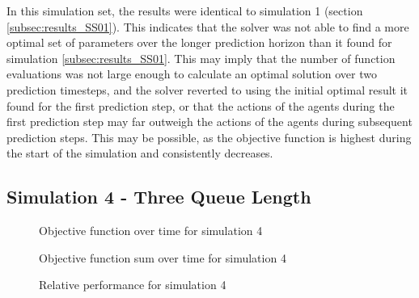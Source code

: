 \documentclass[conference]{IEEEtran}
\begin{document}
In this simulation set, the results were identical to simulation 1 (section \ref{subsec:results_SS01}).
This indicates that the solver was not able to find a more optimal set of parameters over the longer prediction horizon than it found for simulation \ref{subsec:results_SS01}.
This may imply that the number of function evaluations was not large enough to calculate an optimal solution over two prediction timesteps, and the solver reverted to using the initial optimal result it found for the first prediction step, or that the actions of the agents during the first prediction step may far outweigh the actions of the agents during subsequent prediction steps.
This may be possible, as the objective function is highest during the start of the simulation and consistently decreases.


\subsection{Simulation 4 - Three Queue Length} \label{subsec:results_SS04}

\begin{figure}[h]
    \centering
    
    \caption{Objective function over time for simulation 4}
    \label{fig:SS04_obj_hist}
\end{figure} 

%     

\begin{figure}[h]
    \centering
    
    \caption{Objective function sum over time for simulation 4}
    \label{fig:SS04_s_obj_hist}
\end{figure}

\begin{figure}[h]
    \centering
    
    \caption{Relative performance for simulation 4}
    \label{fig:SS04_s_obj_rel}
\end{figure}
\end{document}
